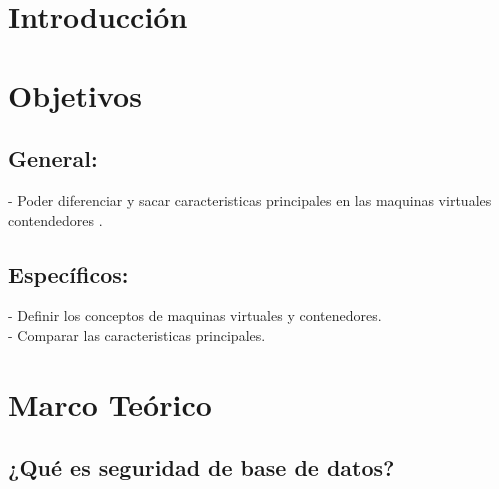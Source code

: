 \documentclass[%
 reprint,
 amsmath,amssymb,
 aps,
]{revtex4-1}
\begin{document}
\maketitle


\section {Introducción}\label{sec:1}





\section{Objetivos}\label{sec:2}
\subsection{General:}
-  Poder diferenciar y sacar caracteristicas principales  en las maquinas virtuales contendedores .
\subsection{Específicos:}
-  Definir los conceptos de maquinas virtuales y contenedores.\\
- Comparar las caracteristicas principales.

\section {Marco Teórico}

\subsection{¿Qué es seguridad de base de datos?}

\end{document}
